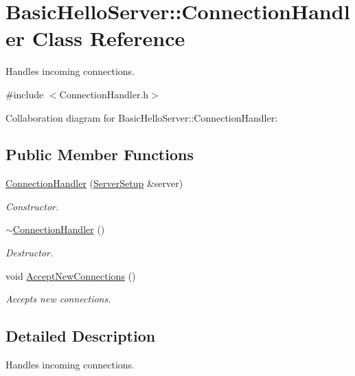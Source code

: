 \hypertarget{classBasicHelloServer_1_1ConnectionHandler}{}\section{Basic\+Hello\+Server\+::Connection\+Handler Class Reference}
\label{classBasicHelloServer_1_1ConnectionHandler}


Handles incoming connections.  




{\ttfamily \#include $<$Connection\+Handler.\+h$>$}



Collaboration diagram for Basic\+Hello\+Server\+::Connection\+Handler\+:
\subsection*{Public Member Functions}
\begin{DoxyCompactItemize}
\item 
\mbox{\hyperlink{classBasicHelloServer_1_1ConnectionHandler_a11a9fe63bb6df14e9245d59a74276fe7}{Connection\+Handler}} (\mbox{\hyperlink{classBasicHelloServer_1_1ServerSetup}{Server\+Setup}} \&server)
\begin{DoxyCompactList}\small\item\em Constructor. \end{DoxyCompactList}\item 
\mbox{\label{classBasicHelloServer_1_1ConnectionHandler_a1e4ec5a90095b11759cb65f8c5c0a712}} 
\mbox{\hyperlink{classBasicHelloServer_1_1ConnectionHandler_a1e4ec5a90095b11759cb65f8c5c0a712}{$\sim$\+Connection\+Handler}} ()
\begin{DoxyCompactList}\small\item\em Destructor. \end{DoxyCompactList}\item 
void \mbox{\hyperlink{classBasicHelloServer_1_1ConnectionHandler_a02a368e291a152cf8f7efc5cfceaecd3}{Accept\+New\+Connections}} ()
\begin{DoxyCompactList}\small\item\em Accepts new connections. \end{DoxyCompactList}\end{DoxyCompactItemize}


\subsection{Detailed Description}
Handles incoming connections. 


